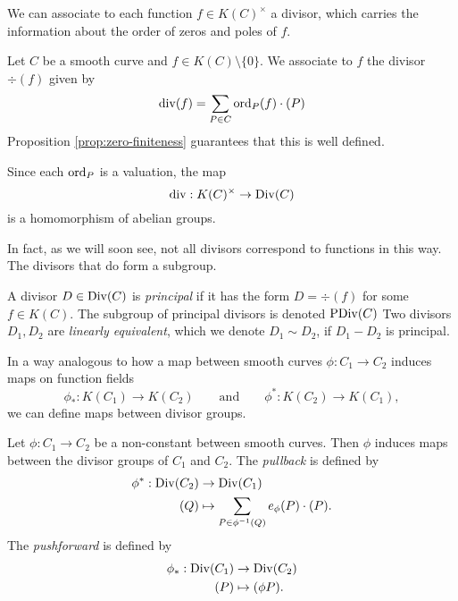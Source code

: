 We can associate to each function $f \in K(C)^\times$ a divisor, which carries
the information about the order of zeros and poles of $f$.

\begin{definition}
	Let $C$ be a smooth curve and $f \in K(C)\setminus\{0\}$. We
	associate to $f$ the divisor $\div(f)$ given by
	\begin{equation*}
		\operatorname{div}(f) = \sum_{P \in C}\operatorname{ord}_P(f)\cdot(P)
	\end{equation*}
	Proposition \ref{prop:zero-finiteness} guarantees that this is well
	defined.
\end{definition}

\begin{remark}
	Since each $\operatorname{ord}_P$ is a valuation, the map
	\begin{equation*}
		\operatorname{div}: K(C)^\times \to \operatorname{Div}(C)
	\end{equation*}
	is a homomorphism of abelian groups.
\end{remark}

In fact, as we will soon see, not all divisors correspond to functions
in this way. The divisors that do form a subgroup.

\begin{definition}
	A divisor $D \in \operatorname{Div}(C)$ is \emph{principal} if it has the form
	$D = \div(f)$ for some $f \in K(C)$. The subgroup of principal divisors
	is denoted $\operatorname{PDiv}(C)$
	Two divisors $D_1, D_2$ are \emph{linearly equivalent}, which we denote
	$D_1 \sim D_2$, if $D_1 - D_2$ is principal.
\end{definition}


In a way analogous to how a map between smooth curves $\phi: C_1 \to C_2$
induces maps on function fields
\begin{equation*}
	\phi_*: K(C_1) \to K(C_2)
	\qquad\textrm{and}\qquad
	\phi^*: K(C_2) \to K(C_1),
\end{equation*}
we can define maps between divisor groups.

\begin{definition}
	Let $\phi: C_1 \to C_2$ be a non-constant between smooth curves.
	Then $\phi$ induces maps between the divisor groups of $C_1$ and $C_2$.
	The \emph{pullback} is defined by
	\begin{align*}
		\phi^*: \operatorname{Div}(C_2) &\to \operatorname{Div}(C_1)\\
		(Q) &\mapsto \sum_{P \in \phi^{-1}(Q)}e_\phi(P)\cdot(P).
	\end{align*}
	The \emph{pushforward} is defined by
	\begin{align*}
		\phi_*: \operatorname{Div}(C_1) &\to \operatorname{Div}(C_2)\\
		(P) &\mapsto (\phi P).
	\end{align*}
\end{definition}

